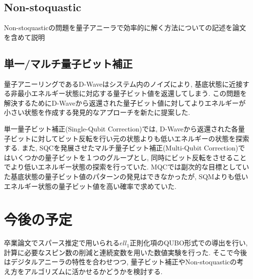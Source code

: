 \documentclass{jarticle}
\begin{document}
\subsection{Non-stoquastic}
Non-stoquasticの問題を量子アニーラで効率的に解く方法についての記述を論文を含めて説明

\subsection{単一/マルチ量子ビット補正}
量子アニーリングであるD-Waveはシステム内のノイズにより, 基底状態に近接する非最小エネルギー状態に対応する量子ビット値を返還してしまう. この問題を解決するためにD-Waveから返還された量子ビット値に対してよりエネルギーが小さい状態を作成する発見的なアプローチを新たに提案した\cite{SQC, MQC}.

単一量子ビット補正(Single-Qubit Correction)では, D-Waveから返還された各量子ビットに対してビット反転を行い元の状態よりも低いエネルギーの状態を探索する. また, SQCを発展させたマルチ量子ビット補正(Multi-Qubit Correction)ではいくつかの量子ビットを１つのグループとし, 同時にビット反転をさせることでより低いエネルギー状態の探索を行っていた. MQCでは副次的な目標としていた基底状態の量子ビット値のパターンの発見はできなかったが, SQMよりも低いエネルギー状態の量子ビット値を高い確率で求めていた.




\section{今後の予定}
卒業論文でスパース推定で用いられる$ell_{1}$正則化項のQUBO形式での導出を行い, 計算に必要なスピン数の削減と連続変数を用いた数値実験を行った. そこで今後はデジタルアニーラの特性を合わせつつ, 量子ビット補正やNon-stoquasticの考え方をアルゴリズムに活かせるかどうかを検討する.

\end{document}
